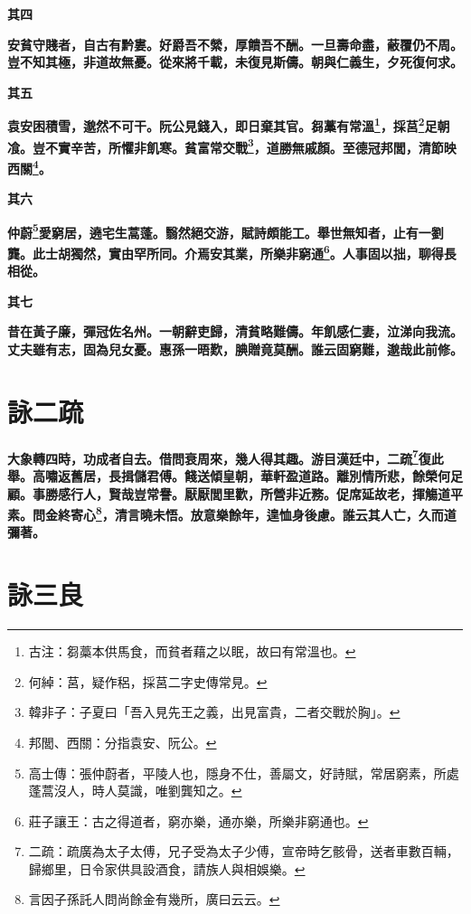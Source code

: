 \begin{quoting}\textbf{其四}\end{quoting}

\textbf{安貧守賤者，自古有黔婁。好爵吾不縈，厚饋吾不酬。一旦壽命盡，蔽覆仍不周。豈不知其極，非道故無憂。從來將千載，未復見斯儔。朝與仁義生，夕死復何求。}

\begin{quoting}\textbf{其五}\end{quoting}

\textbf{袁安困積雪，邈然不可干。阮公見錢入，即日棄其官。芻藁有常溫\footnote{古注：芻藁本供馬食，而貧者藉之以眠，故曰有常溫也。}，採莒\footnote{何綽：莒，疑作稆，採莒二字史傳常見。}足朝飡。豈不實辛苦，所懼非飢寒。貧富常交戰\footnote{韓非子：子夏曰「吾入見先王之義，出見富貴，二者交戰於胸」。}，道勝無戚顏。至德冠邦閭，清節映西關\footnote{邦閭、西關：分指袁安、阮公。}。}

\begin{quoting}\textbf{其六}\end{quoting}

\textbf{仲蔚\footnote{高士傳：張仲蔚者，平陵人也，隱身不仕，善屬文，好詩賦，常居窮素，所處蓬蒿沒人，時人莫識，唯劉龔知之。}愛窮居，遶宅生蒿蓬。翳然絕交游，賦詩頗能工。舉世無知者，止有一劉龔。此士胡獨然，實由罕所同。介焉安其業，所樂非窮通\footnote{莊子讓王：古之得道者，窮亦樂，通亦樂，所樂非窮通也。}。人事固以拙，聊得長相從。}

\begin{quoting}\textbf{其七}\end{quoting}

\textbf{昔在黃子廉，彈冠佐名州。一朝辭吏歸，清貧略難儔。年飢感仁妻，泣涕向我流。丈夫雖有志，固為兒女憂。惠孫一晤歎，腆贈竟莫酬。誰云固窮難，邈哉此前修。}

\section{詠二疏}

\textbf{大象轉四時，功成者自去。借問衰周來，幾人得其趣。游目漢廷中，二疏\footnote{二疏：疏廣為太子太傅，兄子受為太子少傅，宣帝時乞骸骨，送者車數百輛，歸鄉里，日令家供具設酒食，請族人與相娛樂。}復此舉。高嘯返舊居，長揖儲君傅。餞送傾皇朝，華軒盈道路。離別情所悲，餘榮何足顧。事勝感行人，賢哉豈常譽。厭厭閭里歡，所營非近務。促席延故老，揮觴道平素。問金終寄心\footnote{言因子孫託人問尚餘金有幾所，廣曰云云。}，清言曉未悟。放意樂餘年，遑恤身後慮。誰云其人亡，久而道彌著。}

\section{詠三良}


